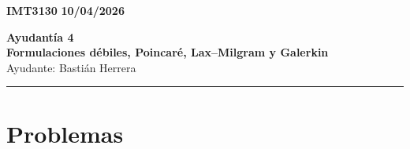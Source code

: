 \documentclass[11pt]{article}
\theoremstyle{thmstyle}
\begin{document}
    \begin{flushleft}
        \small
        \vspace{1pt}
        \textbf{IMT3130} \hfill
        \textbf{10/04/2026}
    \end{flushleft}
    \begin{center}
        \LARGE\textbf{Ayudant\'ia 4}\\
        \vspace{3pt}
        \normalsize\textbf{Formulaciones d\'ebiles, Poincar\'e, Lax--Milgram y Galerkin}\\
        \normalsize Ayudante: Basti\'an Herrera 
        \rule{\textwidth}{0.05mm}
    \end{center}

\section*{Problemas}
\end{document}
